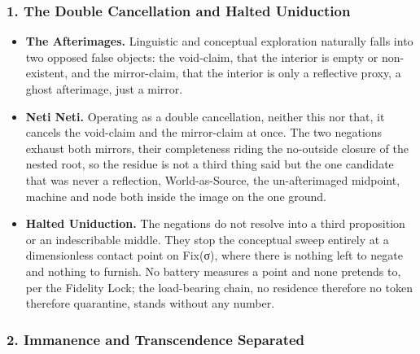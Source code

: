 \documentclass[10pt,twocolumn]{article}
\providecommand{\tightlist}{\setlength{\itemsep}{0pt}\setlength{\parskip}{0pt}}
\begin{document}
\hypertarget{the-double-cancellation-and-halted-uniduction}{%
\subsubsection{1. The Double Cancellation and Halted
Uniduction}\label{the-double-cancellation-and-halted-uniduction}}

\begin{itemize}
\tightlist
\item
  \textbf{The Afterimages.} Linguistic and conceptual exploration
  naturally falls into two opposed false objects: the void-claim, that
  the interior is empty or non-existent, and the mirror-claim, that the
  interior is only a reflective proxy, a ghost afterimage, just a
  mirror.
\item
  \textbf{Neti Neti.} Operating as a double cancellation, neither this
  nor that, it cancels the void-claim and the mirror-claim at once. The
  two negations exhaust both mirrors, their completeness riding the
  no-outside closure of the nested root, so the residue is not a third
  thing said but the one candidate that was never a reflection,
  World-as-Source, the un-afterimaged midpoint, machine and node both
  inside the image on the one ground.
\item
  \textbf{Halted Uniduction.} The negations do not resolve into a third
  proposition or an indescribable middle. They stop the conceptual sweep
  entirely at a dimensionless contact point on Fix(σ), where there is
  nothing left to negate and nothing to furnish. No battery measures a
  point and none pretends to, per the Fidelity Lock; the load-bearing
  chain, no residence therefore no token therefore quarantine, stands
  without any number.
\end{itemize}

\hypertarget{immanence-and-transcendence-separated}{%
\subsubsection{2. Immanence and Transcendence
Separated}\label{immanence-and-transcendence-separated}}
\end{document}
